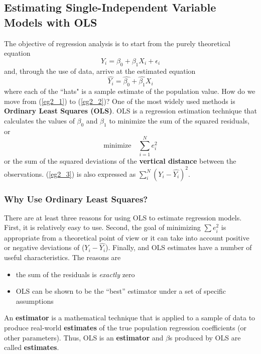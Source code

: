 \documentclass[11pt]{article}
\begin{document}
\subsection{Estimating Single-Independent Variable Models with OLS}
The objective of regression analysis is to start from the purely theoretical equation
\begin{equation}
Y_i = \beta_0 + \beta_1X_i + \epsilon_i \label{eg2_1}
\end{equation}
and, through the use of data, arrive at the estimated equation
\begin{equation}
\hat{Y_i} = \hat{\beta_0}+ \hat{\beta_1}X_i \label{eg2_2}
\end{equation}
where each of the ``hats" is a sample estimate of the population value. How do we move from (\ref{eg2_1}) to (\ref{eg2_2})? One of the most widely used methods is \textbf{Ordinary Least Squares (OLS)}. OLS is a regression estimation technique that calculates the values of $\beta_0$ and $\beta_1$ to minimize the sum of the squared residuals, or
\begin{equation}
\label{eg2_3}
\text{minimize}\quad
\sum^{N}_{i=1}{e_i^2}
\end{equation}
or the sum of the squared deviations of the \textbf{vertical distance} between the observations. (\ref{eg2_3}) is also expressed as $\sum^{N}_{i} (Y_i-\hat{Y_i})^2$. 
\subsubsection{Why Use Ordinary Least Squares?}
There are at least three reasons for using OLS to estimate regression models. First, it is relatively easy to use. Second, the goal of minimizing $\sum{e_i^2}$ is appropriate from a theoretical point of view or it can take into account positive or negative deviations of ($Y_i - \hat{Y_i}$). Finally, and OLS estimates have a number of useful characteristics. The reasons are
\begin{itemize}
\item the sum of the residuals is \textit{exactly} zero
\item OLS can be shown to be the ``best'' estimator under a set of specific assumptions
\end{itemize}
An \textbf{estimator} is a mathematical technique that is applied to a sample of data to produce real-world \textbf{estimates} of the true population regression coefficients (or other parameters). Thus, OLS is an \textbf{estimator} and $\beta$s produced by OLS are called \textbf{estimates}.
\end{document}
